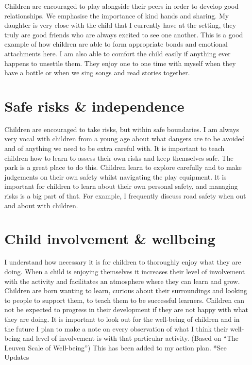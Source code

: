 \documentclass[10pt,a4paper]{report}
\makeatletter
\newcommand{\DESCRIPTION@original@item}{}
\let\DESCRIPTION@original@item\item
\newcommand*{\DESCRIPTION@envir}{DESCRIPTION}
\newlength{\DESCRIPTION@totalleftmargin}
\newlength{\DESCRIPTION@linewidth}
\newcommand{\DESCRIPTION@makelabel}[1]{\llap{#1}}%
\newcommand{\DESCRIPTION@item}[1][]{%
  \setlength{\@totalleftmargin}%
       {\DESCRIPTION@totalleftmargin+\widthof{\textbf{#1 }}-\leftmargin}%
  \setlength{\linewidth}
       {\DESCRIPTION@linewidth-\widthof{\textbf{#1 }}+\leftmargin}%
  \par\parshape \@ne \@totalleftmargin \linewidth
  \DESCRIPTION@original@item[\textbf{#1}]%
}
\newenvironment{DESCRIPTION}
  {\list{}{\setlength{\labelwidth}{0cm}%
           \let\makelabel\DESCRIPTION@makelabel}%
   \setlength{\DESCRIPTION@totalleftmargin}{\@totalleftmargin}%
   \setlength{\DESCRIPTION@linewidth}{\linewidth}%
   \renewcommand{\item}{\ifx\@currenvir\DESCRIPTION@envir
                           \expandafter\DESCRIPTION@item
                        \else
                           \expandafter\DESCRIPTION@original@item
                        \fi}}
  {\endlist}
\makeatother
\begin{document}
\begin{DESCRIPTION}
Children are encouraged to play alongside their peers in order to develop good relationships. We emphasise the importance of kind hands and sharing. My daughter is very close with the child that I currently have at the setting, they truly are good friends who are always excited to see one another. This is a good example of how children are able to form appropriate bonds and emotional attachments here. I am also able to comfort the child easily if anything ever happens to unsettle them. They enjoy one to one time with myself when they have a bottle or when we sing songs and read stories together. 

\section{Safe risks \& independence}

Children are encouraged to take risks, but within safe boundaries. I am always very vocal with children from a young age about what dangers are to be avoided and of anything we need to be extra careful with. It is important to teach children how to learn to assess their own risks and keep themselves safe. The park is a great place to do this. Children learn to explore carefully and to make judgements on their own safety whilst navigating the play equipment. It is important for children to learn about their own personal safety, and managing risks is a big part of that. For example, I frequently discuss road safety when out and about with children. 

\section{Child involvement \& wellbeing}

I understand how necessary it is for children to thoroughly enjoy what they are doing. When a child is enjoying themselves it increases their level of involvement with the activity and facilitates an atmosphere where they can learn and grow. Children are born wanting to learn, curious about their surroundings and looking to people to support them, to teach them to be successful learners. Children can not be expected to progress in their development if they are not happy with what they are doing. It is important to look out for the well-being of children and in the future I plan to make a note on every observation of what I think their well-being and level of involvement is with that particular activity. (Based on “The Leuven Scale of Well-being”) This has been added to my action plan. *See Updates


\end{DESCRIPTION}
\end{document}
